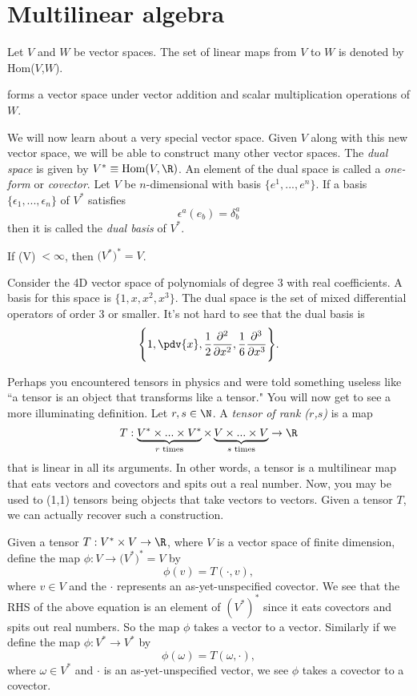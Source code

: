 \section{Multilinear algebra}
Let $V$ and $W$ be vector spaces.
The set of linear maps from $V$ to $W$ is denoted by Hom($V$,$W$).
\begin{proposition}{}{}
   forms a vector space under vector addition 
  and scalar multiplication operations of $W$. 
\end{proposition}
We will now learn about a very special vector space. Given $V$ along with
this new vector space, we will be able to construct many other vector spaces.
The {\it dual space} 
is given by $V^*\equiv\text{Hom}(V,\R)$.
An element of the dual space is called a {\it one-form} or {\it covector}.
Let $V$ be $n$-dimensional with basis $\{e^1,...,e^n\}$. If a basis
$\{\epsilon_1,...,\epsilon_n\}$ of $V^*$ satisfies
  $$\epsilon^a(e_b)=\delta^a_b$$
then it is called the {\it dual basis} of $V^*$.
\begin{theorem}{}{}
  If (V)$\;<\infty$, then $\big(V^*\big)^*=V$.
\end{theorem}
\begin{example*}{}{}
  Consider the 4D vector space of polynomials of degree 3 with
  real coefficients. A basis for this space is $\{1,x,x^2,x^3\}$. 
  The dual space is the set of mixed differential operators of order 3 or 
  smaller. It's not hard to see that the dual basis is 
  $$\Bigg\{1,\pdv{x},
             \frac{1}{2}\frac{\partial^2}{\partial x^2},
             \frac{1}{6}\frac{\partial^3}{\partial x^3}\Bigg\}.$$
\end{example*}
Perhaps you encountered tensors in physics and were told something useless
like ``a tensor is an object that transforms like a tensor."
You will now get to see a more illuminating definition.
  Let $r,s\in\N$.
  A {\it tensor of rank ($r$,$s$)} is a map
  $$T:\underbrace{V^*\times...\times V^*}_\text{$r$ times}\times
      \underbrace{V\times...\times V}_\text{$s$ times}\to\R$$
  that is linear in all its arguments.
In other words, a tensor is a multilinear map that eats
vectors and covectors and spits out a real number. Now, you may be used
to (1,1) tensors being objects that take vectors to vectors. Given
a tensor $T$, we can actually recover such a construction.
\begin{example*}{}{}
  Given a tensor $T:V^*\times V\to\R$, where $V$ is a vector space
  of finite dimension, define the map $\phi:V\to \big(V^*\big)^*=V$ by
  $$\phi(v)=T(\cdot,v),$$
  where $v\in V$ and the $\cdot$ represents an as-yet-unspecified covector. 
  We see that the RHS of the above equation is an element of $(V^*)^*$ 
  since it eats covectors and spits out real numbers. So the map $\phi$ takes
  a vector to a vector. Similarly if we 
  define the map $\phi:V^*\to V^*$ by
  $$\phi(\omega)=T(\omega,\cdot),$$
  where $\omega\in V^*$ and $\cdot$ is an as-yet-unspecified vector, we see
  $\phi$ takes a covector to a covector.
\end{example*}
